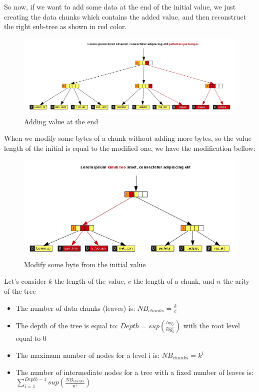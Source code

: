\documentclass[10pt,a4paper]{report}
\begin{document}
So now, if we want to add some data at the end of the initial value, we just creating the data chunks which contains the added value, and then reconstruct the right sub-tree as shown in red color. 

\begin{figure}[H]
\centerline{\includegraphics[scale=0.5]{img/chunk-add-at-the-end.jpg}}
\caption{Adding value at the end}
\end{figure}

When we modify some bytes of a chunk without adding more bytes, so the value length of the initial is equal to the modified one, we have the modification bellow: 

\begin{figure}[H]
\centerline{\includegraphics[scale=0.5]{img/chunk-modified-with-same-size.jpg}}
\caption{Modify some byte from the initial value}
\end{figure}

Let's consider $k$ the length of the value, $c$ the length of a chunk, and $n$ the arity of the tree \newline

\begin{itemize}
\item The number of data chunks (leaves) is: $NB_{chunks} = \frac{k}{c}$
\item The depth of the tree is equal to: $Depth = sup(\frac{log_{c}}{log_{k}})$ with the root level equal to $0$
\item The maximum number of nodes for a level i is: $NB_{chunks} = k^{i} $
\item The number of intermediate nodes for a tree with a fixed number of leaves is: $ \sum\limits_{i=1}^{Depth - 1} sup(\frac{NB_{chunks}}{n^{i}})  $
\end{itemize}
\end{document}
